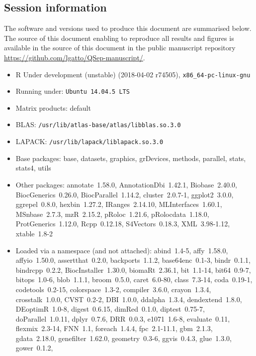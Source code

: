 \documentclass[12pt]{article}\usepackage[]{graphicx}\usepackage[]{color}
\begin{document}
\begin{appendices}


\section{Session information}

The software and versions used to produce this document are summarised
below. The source of this document enabling to reproduce all results
and figures is available in the source of this document in the public
manuscript repository~\cite{qseprepo}
\url{https://github.com/lgatto/QSep-manuscript/}.


\begin{itemize}\raggedright
  \item R Under development (unstable) (2018-04-02 r74505), \verb|x86_64-pc-linux-gnu|
  \item Running under: \verb|Ubuntu 14.04.5 LTS|
  \item Matrix products: default
  \item BLAS: \verb|/usr/lib/atlas-base/atlas/libblas.so.3.0|
  \item LAPACK: \verb|/usr/lib/lapack/liblapack.so.3.0|
  \item Base packages: base, datasets, graphics, grDevices,
    methods, parallel, stats, stats4, utils
  \item Other packages: annotate~1.58.0, AnnotationDbi~1.42.1,
    Biobase~2.40.0, BiocGenerics~0.26.0, BiocParallel~1.14.2,
    cluster~2.0.7-1, ggplot2~3.0.0, ggrepel~0.8.0, hexbin~1.27.2,
    IRanges~2.14.10, MLInterfaces~1.60.1, MSnbase~2.7.3,
    mzR~2.15.2, pRoloc~1.21.6, pRolocdata~1.18.0,
    ProtGenerics~1.12.0, Rcpp~0.12.18, S4Vectors~0.18.3,
    XML~3.98-1.12, xtable~1.8-2
  \item Loaded via a namespace (and not attached): abind~1.4-5,
    affy~1.58.0, affyio~1.50.0, assertthat~0.2.0, backports~1.1.2,
    base64enc~0.1-3, bindr~0.1.1, bindrcpp~0.2.2,
    BiocInstaller~1.30.0, biomaRt~2.36.1, bit~1.1-14, bit64~0.9-7,
    bitops~1.0-6, blob~1.1.1, broom~0.5.0, caret~6.0-80,
    class~7.3-14, coda~0.19-1, codetools~0.2-15, colorspace~1.3-2,
    compiler~3.6.0, crayon~1.3.4, crosstalk~1.0.0, CVST~0.2-2,
    DBI~1.0.0, ddalpha~1.3.4, dendextend~1.8.0, DEoptimR~1.0-8,
    digest~0.6.15, dimRed~0.1.0, diptest~0.75-7,
    doParallel~1.0.11, dplyr~0.7.6, DRR~0.0.3, e1071~1.6-8,
    evaluate~0.11, flexmix~2.3-14, FNN~1.1, foreach~1.4.4,
    fpc~2.1-11.1, gbm~2.1.3, gdata~2.18.0, genefilter~1.62.0,
    geometry~0.3-6, ggvis~0.4.3, glue~1.3.0, gower~0.1.2,

\end{itemize}
\end{appendices}
\end{document}
